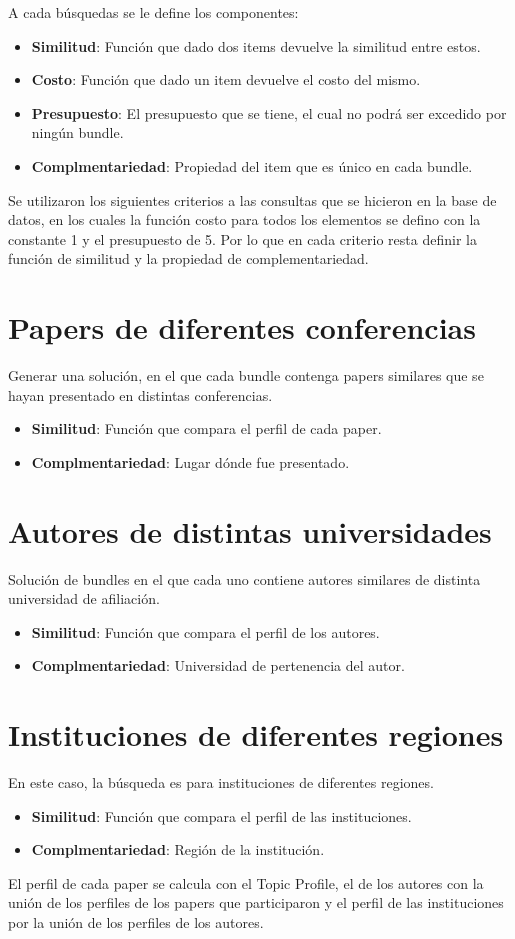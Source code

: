 A cada búsquedas se le define los componentes:
\begin{itemize}
  \item \textbf{Similitud}: Función que dado dos items devuelve la similitud entre estos.
  \item \textbf{Costo}: Función que dado un item devuelve el costo del mismo.
  \item \textbf{Presupuesto}: El presupuesto que se tiene, el cual no podrá ser excedido por ningún bundle.
  \item \textbf{Complmentariedad}: Propiedad del item que es único en cada bundle.
\end{itemize}

Se utilizaron los siguientes criterios a las consultas que se hicieron en la base de datos, 
en los cuales la función costo para todos los elementos se defino con la constante 1 y el presupuesto de 5.
Por lo que en cada criterio resta definir la función de similitud y la propiedad de complementariedad.

\section{Papers de diferentes conferencias}\label{bus:papSimDisLug}
Generar una solución, en el que cada bundle contenga 
papers similares que se hayan presentado en distintas conferencias.\\
\begin{itemize}
  \item \textbf{Similitud}: Función que compara el perfil de cada paper.
  \item \textbf{Complmentariedad}: Lugar dónde fue presentado.
\end{itemize}

\section{Autores de distintas universidades}
Solución de bundles en el que cada uno contiene autores 
similares de distinta universidad de afiliación.\\
\begin{itemize}
  \item \textbf{Similitud}: Función que compara el perfil de los autores.
  \item \textbf{Complmentariedad}: Universidad de pertenencia del autor.
\end{itemize}

\section{Instituciones de diferentes regiones}
En este caso, la búsqueda es para instituciones de diferentes regiones. 
\begin{itemize}
  \item \textbf{Similitud}: Función que compara el perfil de las instituciones.
  \item \textbf{Complmentariedad}: Región de la institución.
\end{itemize}

El perfil de cada paper se calcula con el Topic Profile, el de los autores con la unión de los perfiles de los papers que participaron
y el perfil de las instituciones por la unión de los perfiles de los autores.
